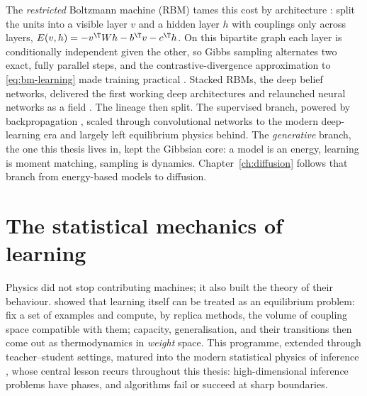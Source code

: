 The \emph{restricted} Boltzmann machine (RBM) tames this cost by
architecture \citep{smolensky1986information}: split the units into a
visible layer $v$ and a hidden layer $h$ with couplings only across
layers, $E(v,h) = -v^\T W h - b^\T v - c^\T h$. On this bipartite graph
each layer is conditionally independent given the other, so Gibbs
sampling alternates two exact, fully parallel steps, and the
contrastive-divergence approximation to \eqref{eq:bm-learning} made
training practical \citep{hinton2002training}. Stacked RBMs, the deep
belief networks, delivered the first working deep architectures and
relaunched neural networks as a field \citep{hinton2006fast}. The lineage
then split. The supervised branch, powered by backpropagation
\citep{rumelhart1986learning}, scaled through convolutional networks to
the modern deep-learning era \citep{krizhevsky2012imagenet,
lecun2015deep} and largely left equilibrium physics behind. The
\emph{generative} branch, the one this thesis lives in, kept the Gibbsian
core: a model is an energy, learning is moment matching, sampling is
dynamics. Chapter~\ref{ch:diffusion} follows that branch from
energy-based models to diffusion.

\section{The statistical mechanics of learning}\label{sec:statmech-learning}

Physics did not stop contributing machines; it also built the theory of
their behaviour. \citet{gardner1988space} showed that learning itself can
be treated as an equilibrium problem: fix a set of examples and compute,
by replica methods, the volume of coupling space compatible with them;
capacity, generalisation, and their transitions then come out as
thermodynamics in \emph{weight} space. This programme, extended through
teacher--student settings, matured into the modern statistical physics of
inference \citep{zdeborova2016statistical}, whose central lesson recurs
throughout this thesis: high-dimensional inference problems have phases,
and algorithms fail or succeed at sharp boundaries.

